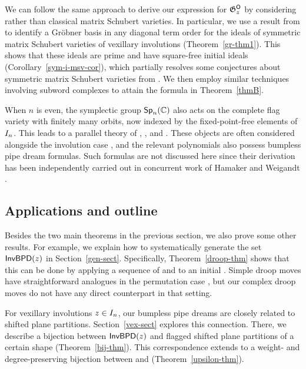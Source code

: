 \documentclass[10pt]{article}
\begin{document}
We can follow the same approach to derive 
our expression for $\mathfrak{G}^{\mathsf{O}}_z$ by considering  rather than classical matrix Schubert varieties. 
In particular, we use a result from
\cite{GMN} to identify a Gr\"obner basis in any diagonal term order 
for the ideals of symmetric matrix Schubert varieties of vexillary involutions (Theorem~\ref{gr-thm1}). 
This shows that these ideals are prime and have square-free initial ideals 
(Corollary~\ref{sym-i-msv-cor}), which partially resolves some
conjectures about 
symmetric matrix Schubert varieties from \cite{MarPaw2024}.
We then employ similar techniques involving subword complexes
to attain the formula in Theorem~\ref{thmB}.


 \begin{remark}
 When $n$ is even, the symplectic group $\mathsf{Sp}_n(\mathbb{C})$
 also acts on the complete flag variety
 with finitely many orbits, now indexed by the fixed-point-free elements of $I_n$. This leads to a parallel theory of , , and .
 These objects are often considered alongside the involution case \cite{HMP1,HMP3,HMP6,MarPawK,WyserYong2017},
 and the relevant polynomials also possess bumpless pipe dream formulas.
Such formulas are not discussed here since their derivation has been
independently carried out in concurrent work of Hamaker and Weigandt \cite{HamakerWeigandt}.
 \end{remark}
 
\subsection{Applications and outline}

Besides the two main theorems in the previous section,
we also prove some other results. For example, we explain how to
systematically generate the set $\mathsf{InvBPD}(z)$ in Section~\ref{gen-sect}. 
Specifically, Theorem~\ref{droop-thm} shows that this can be done by applying
a sequence of  and  to an initial .
Simple droop moves have straightforward analogues in the permutation case \cite{LLS}, but our complex droop moves do not have any direct counterpart in that setting.

For vexillary involutions $z \in I_n$, our bumpless pipe dreams 
are closely related to shifted plane partitions. Section~\ref{vex-sect}
explores this connection. There, we describe a bijection
between $\mathsf{InvBPD}(z)$ and flagged shifted plane partitions of a certain shape (Theorem~\ref{bij-thm}). This correspondence extends to a weight- and degree-preserving bijection between  and  (Theorem~\ref{upsilon-thm}).
\end{document}
